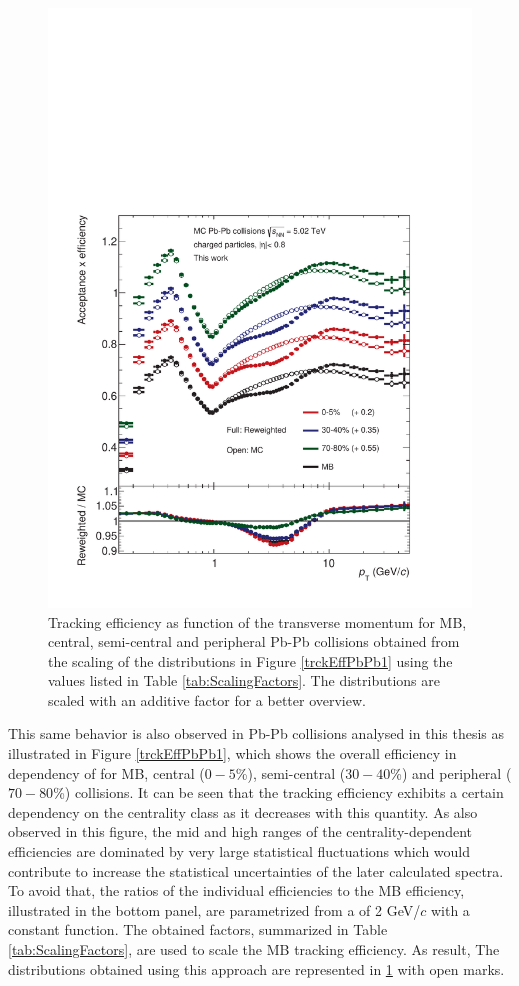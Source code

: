 \documentclass[12pt,a4paper]{report}
\begin{document}
\begin{figure}[tb!]
\centering
\includegraphics[width=12cm]{Plots/trckEffPbPb2.pdf}  
\caption{Tracking efficiency as function of the transverse momentum for MB, central, semi-central and peripheral Pb-Pb collisions obtained from the scaling of the distributions in Figure \ref{trckEffPbPb1} using the values listed in Table \ref{tab:ScalingFactors}. The distributions are scaled with an additive factor for a better overview.}
\label{trckEffPbPb2}
\end{figure}
This same behavior is also observed in Pb-Pb collisions analysed in this thesis as illustrated in Figure \ref{trckEffPbPb1}, which shows the overall efficiency in dependency of \pt for MB, central ($0-5$\%), semi-central ($30-40$\%) and peripheral ($70-80$\%) collisions. It can be seen that the tracking efficiency exhibits a certain dependency on the centrality class as it decreases with this quantity. As also observed in this figure, the mid and high \pt ranges of the centrality-dependent efficiencies are dominated by very large statistical fluctuations which would contribute to increase the statistical uncertainties of the later calculated \pt spectra. To avoid that, the ratios of the individual efficiencies to the MB efficiency, illustrated in the bottom panel, are parametrized from a \pt of 2 GeV/$c$ with a constant function. The obtained factors, summarized in Table \ref{tab:ScalingFactors}, are used to scale the MB tracking efficiency. As result,  The distributions obtained using this approach are represented in \ref{trckEffPbPb2} with open marks. 
\end{document}
